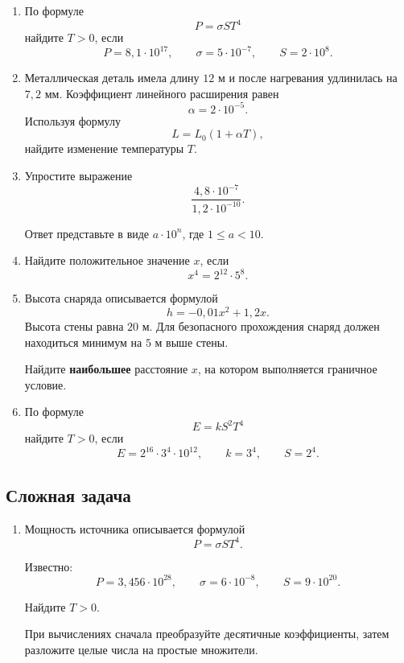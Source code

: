 \documentclass[a4paper,12pt]{article}
\begin{document}
\begin{enumerate}[label=\textbf{\arabic*.},start=4]

\item
По формуле
\[
P=\sigma ST^4
\]
найдите \(T>0\), если
\[
P=8,1\cdot10^{17},
\qquad
\sigma=5\cdot10^{-7},
\qquad
S=2\cdot10^8.
\]

\item
Металлическая деталь имела длину \(12\) м и после нагревания удлинилась
на \(7,2\) мм. Коэффициент линейного расширения равен
\[
\alpha=2\cdot10^{-5}.
\]
Используя формулу
\[
L=L_0(1+\alpha T),
\]
найдите изменение температуры \(T\).

\item
Упростите выражение
\[
\frac{
4,8\cdot10^{-7}
}{
1,2\cdot10^{-10}
}.
\]

Ответ представьте в виде \(a\cdot10^n\), где \(1\le a<10\).

\item
Найдите положительное значение \(x\), если
\[
x^4=2^{12}\cdot5^8.
\]

\item
Высота снаряда описывается формулой
\[
h=-0,01x^2+1,2x.
\]
Высота стены равна \(20\) м. Для безопасного прохождения снаряд должен
находиться минимум на \(5\) м выше стены.

Найдите \textbf{наибольшее} расстояние \(x\), на котором выполняется
граничное условие.

\item
По формуле
\[
E=kS^2T^4
\]
найдите \(T>0\), если
\[
E=2^{16}\cdot3^4\cdot10^{12},
\qquad
k=3^4,
\qquad
S=2^4.
\]

\end{enumerate}

\subsection*{\textcolor{accent}{Сложная задача}}

\begin{enumerate}[label=\textbf{\arabic*.},start=10]

\item
Мощность источника описывается формулой
\[
P=\sigma ST^4.
\]

Известно:
\[
P=3,456\cdot10^{28},
\qquad
\sigma=6\cdot10^{-8},
\qquad
S=9\cdot10^{20}.
\]

Найдите \(T>0\).

При вычислениях сначала преобразуйте десятичные коэффициенты, затем
разложите целые числа на простые множители.

\end{enumerate}
\end{document}
